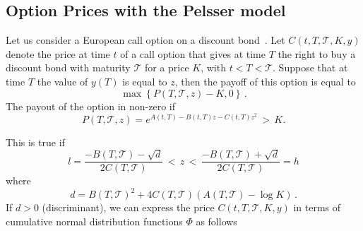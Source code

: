 \subsection{Option Prices with the Pelsser model}
\label{OP}
Let us consider a European call option on a discount bond~\cite{ArtPelsser}. Let $C(t, T, \mathcal{T}, K, y)$ denote the price at time $t$ of a call option that gives at time $T$ the right to buy a discount bond with maturity $\mathcal{T}$ for a price $K$, with $ t < T < \mathcal{T}$. Suppose that at time $T$ the value of $y(T)$ is equal to $z$, then the payoff of this option is equal to
$$ \max{\left\lbrace P(T, \mathcal{T}, z) - K, 0 \right\rbrace } \, .$$
The payout of the option in non-zero if
$$ P(T, \mathcal{T}, z) = \displaystyle{e}^{\displaystyle{A(t,T) - B(t,T) z - C(t,T) z^2 }} \, > \, K .$$
\begin{comment}
where
\begin{eqnarray}
D(t,T) & = & \dfrac{2\gamma e^{\gamma(T-t)}}{(a+\gamma)e^{2\gamma(T-t)}+(\gamma - a)} \nonumber \\
C(t,T) & = & \dfrac{e^{2\gamma(T-t)}-1}{(a+\gamma)e^{2\gamma(T-t)}+(\gamma - a)} \nonumber \\
B(t,T) & = & 2 D(t,T) \displaystyle{ \int_t^T \dfrac{\alpha(s)}{D(s,T)} \, ds }\nonumber \\
A(t,T) & = & \displaystyle{\int_t^T \frac{1}{2}\sigma^2 B(s,T)^2 - \sigma^2 C(s,T) - \alpha(s)^2 \, ds  } \nonumber \\
\gamma & = & \sqrt{a^2+2\sigma^2} \, .
\end{eqnarray}
\end{comment}
This is true if
$$ l = \dfrac{-B(T,\mathcal{T})-\sqrt{d}}{2 C(T,\mathcal{T})} \, < \, z \, < \, \dfrac{-B(T,\mathcal{T})+\sqrt{d}}{2 C(T,\mathcal{T})} = h $$
where
$$ d = {B(T,\mathcal{T})}^2 + 4C(T,\mathcal{T})(A(T,\mathcal{T})-\log{K}) \, . $$
If $d > 0$ (discriminant), we can express the price $C(t, T, \mathcal{T}, K, y)$ in terms of cumulative normal distribution functions $\Phi$ as follows

